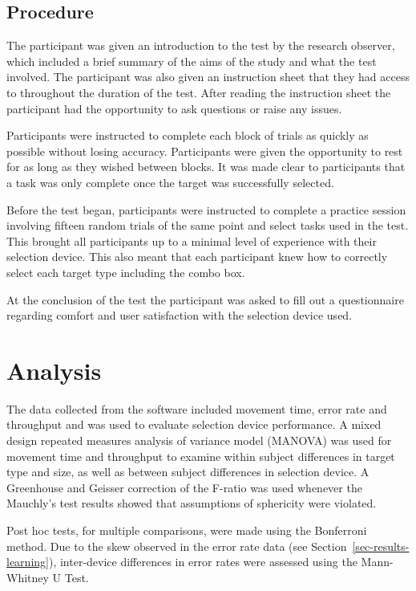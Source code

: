 \documentclass[a4paper]{article}
\begin{document}
\subsection{Procedure}
\label{sec-method-procedure}

The participant was given an introduction to the test by the research
observer, which included a brief summary of the aims of the study and
what the test involved. The participant was also given an instruction
sheet that they had access to throughout the duration of the test. After
reading the instruction sheet the participant had the opportunity to ask
questions or raise any issues.

Participants were instructed to complete each block of trials as quickly
as possible without losing accuracy. Participants were given the
opportunity to rest for as long as they wished between blocks. It was
made clear to participants that a task was only complete once the target
was successfully selected.

Before the test began, participants were instructed to complete a
practice session involving fifteen random trials of the same point and
select tasks used in the test. This brought all participants up to a
minimal level of experience with their selection device. This also meant
that each participant knew how to correctly select each target type
including the combo box.

At the conclusion of the test the participant was asked to fill out a
questionnaire regarding comfort and user satisfaction with the selection
device used.


\section{Analysis}
\label{sec-analysis}

The data collected from the software included movement time, error rate
and throughput and was used to evaluate selection device performance. A
mixed design repeated measures analysis of variance model (MANOVA) was
used for movement time and throughput to examine within subject
differences in target type and size, as well as between subject
differences in selection device. A Greenhouse and Geisser correction of
the F-ratio was used whenever the Mauchly's test results showed that
assumptions of sphericity were violated.

Post hoc tests, for multiple comparisons, were made using the Bonferroni
method. Due to the skew observed in the error rate data (see
Section~\ref{sec-results-learning}), inter-device differences in error
rates were assessed using the Mann-Whitney U Test.
\end{document}
